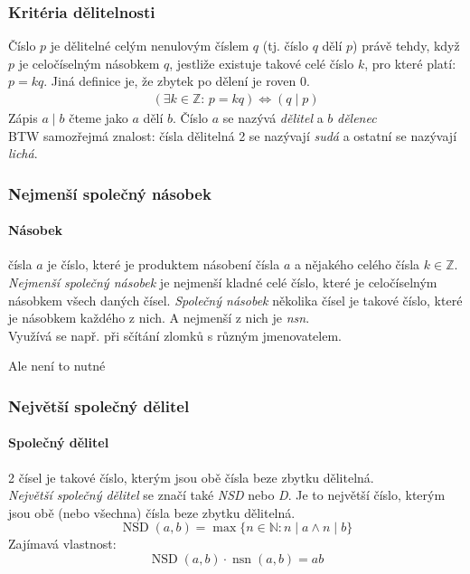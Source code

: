 \documentclass[12pt]{article}
\begin{document}
\subsubsection{Kritéria dělitelnosti}
Číslo $p$ je dělitelné celým nenulovým číslem $q$ (tj. číslo $q$ dělí $p$) právě tehdy, když $p$ je celočíselným násobkem $q$, jestliže existuje takové celé číslo $k$, pro které platí: $p = kq$. Jiná definice je, že zbytek po dělení je roven 0.
\begin{align}
( \exists k \in \mathbb{Z}: \, p = kq) \iff ( q \mid p)
\end{align}
Zápis $a \mid b$ čteme jako $a$ dělí $b$. Číslo $a$ se nazývá \emph{dělitel} a $b$ \emph{dělenec}
\\BTW samozřejmá znalost: čísla dělitelná 2 se nazývají \emph{sudá} a ostatní se nazývají \emph{lichá}.
\subsubsection{Nejmenší společný násobek}
\paragraph{Násobek} čísla $a$ je číslo, které je produktem násobení čísla $a$ a nějakého celého čísla $k \in \mathbb{Z}$.\\
\emph{Nejmenší společný násobek} je nejmenší kladné celé číslo, které je celočíselným násobkem  všech daných čísel. \emph{Společný násobek} několika čísel je takové číslo, které je násobkem každého z nich. A nejmenší z nich je \emph{nsn}.\\
Využívá se např. při sčítání zlomků s různým jmenovatelem. \begin{scriptsize} Ale není to nutné \end{scriptsize}
\subsubsection{Největší společný dělitel}
\paragraph{Společný dělitel} 2 čísel je takové číslo, kterým jsou obě čísla beze zbytku dělitelná.\\
\emph{Největší společný dělitel} se značí také \emph{NSD} nebo \emph{D}. Je to největší číslo, kterým jsou obě (nebo všechna) čísla beze zbytku dělitelná.
\begin{equation}
\operatorname {NSD} (a,b)=\max\{n\in \mathbb {N} :n\mid a\wedge n\mid b\}
\end{equation}
Zajímavá vlastnost: 
\begin{equation}
 \operatorname {NSD} (a,b) \cdot \operatorname {nsn} (a,b)=ab
\end{equation}
\end{document}
